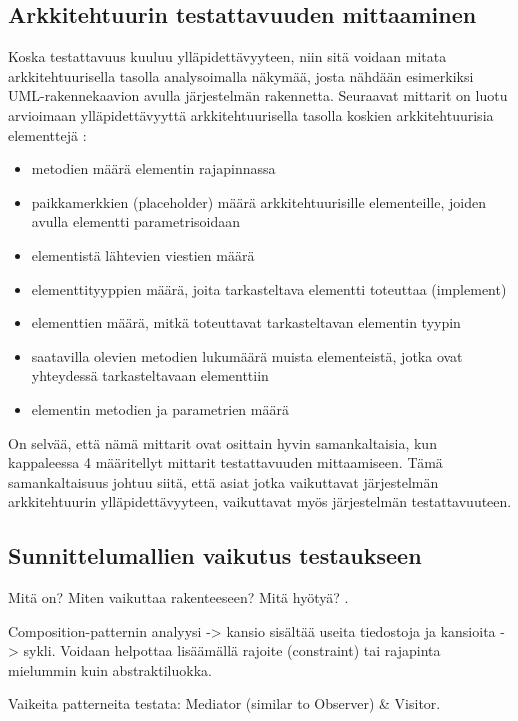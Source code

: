 \documentclass[finnish]{tktltiki2}
\theoremstyle{definition}
\theoremstyle{remark}
\begin{document}
\subsection{Arkkitehtuurin testattavuuden mittaaminen}

Koska testattavuus kuuluu ylläpidettävyyteen, niin sitä voidaan mitata arkkitehtuurisella tasolla analysoimalla näkymää, josta nähdään esimerkiksi UML-rakennekaavion avulla järjestelmän rakennetta. Seuraavat mittarit on luotu arvioimaan ylläpidettävyyttä arkkitehtuurisella tasolla koskien arkkitehtuurisia elementtejä \citep[s. 3-4]{bengtsson1998towards}:

\begin{itemize}
	\item metodien määrä elementin rajapinnassa
	\item paikkamerkkien (placeholder) määrä arkkitehtuurisille elementeille, joiden avulla elementti parametrisoidaan
	\item elementistä lähtevien viestien määrä
	\item elementtityyppien määrä, joita tarkasteltava elementti toteuttaa (implement)
	\item elementtien määrä, mitkä toteuttavat tarkasteltavan elementin tyypin
	\item saatavilla olevien metodien lukumäärä muista elementeistä, jotka ovat yhteydessä tarkasteltavaan elementtiin
	\item elementin metodien ja parametrien määrä
\end{itemize}

On selvää, että nämä mittarit ovat osittain hyvin samankaltaisia, kun kappaleessa 4 määritellyt mittarit testattavuuden mittaamiseen. Tämä samankaltaisuus johtuu siitä, että asiat jotka vaikuttavat järjestelmän arkkitehtuurin ylläpidettävyyteen, vaikuttavat myös järjestelmän testattavuuteen.


\subsection{Sunnittelumallien vaikutus testaukseen}

Mitä on? Miten vaikuttaa rakenteeseen? Mitä  hyötyä? \citep{baudry_measuring_2003}.

Composition-patternin analyysi -> kansio sisältää useita tiedostoja ja kansioita -> sykli. Voidaan helpottaa lisäämällä rajoite (constraint) tai rajapinta mielummin kuin abstraktiluokka. 

Vaikeita patterneita testata: Mediator (similar to Observer) \& Visitor.
\end{document}
